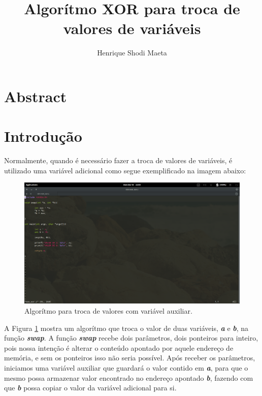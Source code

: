 \documentclass[12pt]{article}
\title{Algorítmo XOR para troca de valores de variáveis}
\author{Henrique Shodi Maeta\inst{1} }
\begin{document}
 

\maketitle

\section{Abstract}

\section{Introdução}

Normalmente, quando é necessário fazer a troca de valores de variáveis, é utilizado uma variável adicional como segue exemplificado na imagem abaixo:


\begin{figure}[ht]
\centering
\includegraphics[width=1\textwidth]{non_xor.png}
\caption{Algorítmo para troca de valores com variável auxiliar.}
\label{fig:exampleFig1}
\end{figure}

A Figura \ref{fig:exampleFig1} mostra um algorítmo que troca o valor de duas variáveis, \textbf{\textit{a}} e \textbf{\textit{b}}, na função \textbf{\textit{swap}}. A função \textbf{\textit{swap}} recebe dois parâmetros, dois ponteiros para inteiro, pois nossa intenção é alterar o conteúdo apontado por aquele endereço de memória, e sem os ponteiros isso não seria possível. Após receber os parâmetros, iniciamos uma variável auxiliar que guardará o valor contido em \textbf{\textit{a}}, para que o mesmo possa armazenar valor encontrado no endereço apontado \textbf{\textit{b}}, fazendo com que \textbf{\textit{b}} possa copiar o valor da variável adicional para si.
\end{document}
